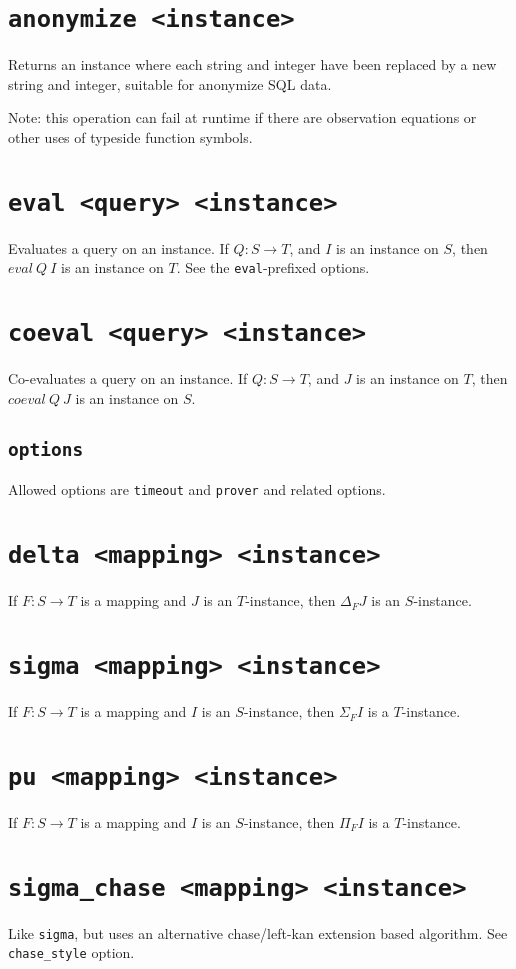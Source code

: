 \documentclass[10pt]{book}
\begin{document}
\section{{\tt anonymize <instance>}}
Returns an instance where each string and integer have been replaced by a new string and integer, suitable for anonymize SQL data.

Note: this operation can fail at runtime if there are observation equations or other uses of typeside function symbols.

\section{{\tt eval <query> <instance>}}
Evaluates a query on an instance.  If $Q : S \to T$, and $I$ is an instance on $S$, then $eval \ Q \ I$ is an instance on $T$.
See the {\tt eval}-prefixed options.

\section{{\tt coeval <query> <instance>}}
Co-evaluates a query on an instance.  If $Q : S \to T$, and $J$ is an instance on $T$, then $coeval \ Q \ J$ is an instance on $S$.
\subsection{\tt options}
Allowed options are {\tt timeout} and {\tt prover} and related options.

\section{{\tt delta <mapping> <instance>}}
If $F : S \to T$ is a mapping and $J$ is an $T$-instance, then $\Delta_F J$ is an $S$-instance. 

\section{{\tt sigma <mapping> <instance>}}
If $F : S \to T$ is a mapping and $I$ is an $S$-instance, then $\Sigma_F I$ is a $T$-instance. 

\section{{\tt pu <mapping> <instance>}}
If $F : S \to T$ is a mapping and $I$ is an $S$-instance, then $\Pi_F I$ is a $T$-instance. 

\section{{\tt sigma\_chase <mapping> <instance>}}
Like {\tt sigma}, but uses an alternative chase/left-kan extension based algorithm.  See {\tt chase\_style} option.
\end{document}
